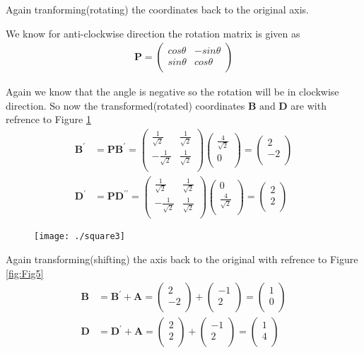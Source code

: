 \documentclass[12pt]{article}
\newcommand{\myvec}[1]{\ensuremath{\begin{pmatrix}#1\end{pmatrix}}}
\let\vec\mathbf
\begin{document}
\newpage
Again tranforming(rotating) the coordinates back to the original axis.

We know for anti-clockwise direction the rotation matrix is given as
\begin{align}
\vec{P} =
\myvec{
cos\theta & -sin\theta \\
sin\theta & cos\theta \\
}
\end{align}

Again we know that the angle is negative so the rotation will be in clockwise direction. So now the transformed(rotated) coordinates $\vec{B} \text{ and } \vec{D}$ are with refrence to Figure \ref{fig:Fig4}
\begin{align}
\vec{B^{\prime}} &= \vec{P}\vec{B^{\prime}} = \myvec{
\frac{1}{\sqrt{2}} & \frac{1}{\sqrt{2}} \\
-\frac{1}{\sqrt{2}} & \frac{1}{\sqrt{2}}\\
}
\myvec{
 \frac{4}{\sqrt{2}}\\
 0\\
} = 
\myvec{
2 \\
-2\\
}\\
\vec{D^{\prime}} &= \vec{P}\vec{D^{\prime \prime}} = \myvec{
\frac{1}{\sqrt{2}} & \frac{1}{\sqrt{2}} \\
-\frac{1}{\sqrt{2}} & \frac{1}{\sqrt{2}}\\
}
\myvec{
 0\\
 \frac{4}{\sqrt{2}}\\
} = 
\myvec{
2 \\
2 \\
}
\end{align}

\begin{figure}[!h]
	\begin{center} 
	    \texttt{[image: ./square3]}
	\end{center}
\caption{}
\label{fig:Fig4}
\end{figure}

Again transforming(shifting) the axis back to the original with refrence to Figure \ref{fig:Fig5}
\begin{align}
\vec{B} &= \vec{B^{\prime}}+\vec{A} = \myvec{
2 \\
-2\\
}+\myvec{
-1 \\
2\\
} = 
\myvec{
1 \\
0\\
}\\
\vec{D} &= \vec{D^{\prime}}+\vec{A} = \myvec{
2 \\
2\\
}+\myvec{
-1 \\
2\\
} = 
\myvec{
1 \\
4 \\
}
\end{align}
\end{document}
